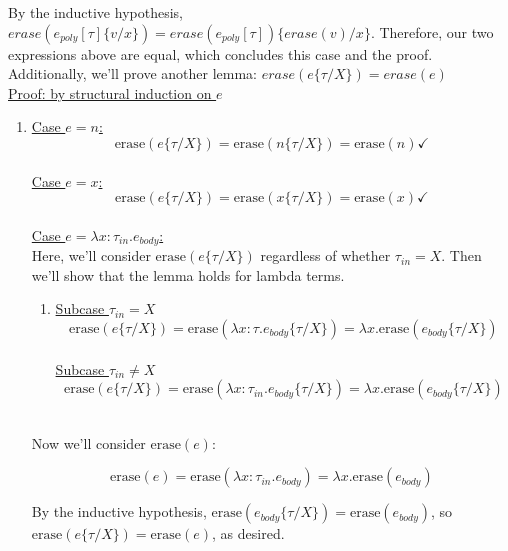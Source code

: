 \documentclass[10pt]{article}
\begin{document}
\begin{exercise}
By the inductive hypothesis, $\mathit{erase}(e_{poly}[\tau]\{v/x\}) = \mathit{erase}(e_{poly}[\tau])\{\mathit{erase}(v)/x\}$. Therefore, our two expressions above are equal, which concludes this case and the proof. \checkmark\\

Additionally, we'll prove another lemma: $erase(e\{\tau/X\}) = erase(e)$ \\

\noindent \underline{Proof: by structural induction on $e$}
\begin{enumerate}[\hspace{20pt}]
	\item
	\underline{Case $e = n$:}\\
	$$\text{erase}(e\{\tau/ X\}) = \text{erase}(n\{\tau / X\}) = \text{erase}(n) 	\checkmark$$ \\
	
	\underline{Case $e = x$:}\\
	$$\text{erase}(e\{\tau/ X\}) = \text{erase}(x\{\tau / X\}) = \text{erase}(x)
	\checkmark$$ \\
	
	\underline{Case $e = \lambda x: \tau_{in}.e_{body}$:}\\
	Here, we'll consider $\text{erase}(e\{\tau / X\})$ regardless of whether $
	\tau_{in} = X$. Then we'll show that the lemma holds for lambda terms.
	
	\begin{enumerate}[\hspace{20pt}]
	\item
	\underline{Subcase $\tau_{in} = X$} \\
	$$\text{erase}(e\{\tau / X\}) = \text{erase}(\lambda x:\tau.e_{body}\{\tau/X\}) 
	= \lambda x.\text{erase}(e_{body}\{\tau/X\})$$ \\
	
	\underline{Subcase $\tau_{in} \neq X$} \\
	$$\text{erase}(e\{\tau / X\}) = \text{erase}(\lambda x:\tau_{in}.e_{body}\{\tau/X	\}) 
	= \lambda x.\text{erase}(e_{body}\{\tau/X\})$$ \\
	\end{enumerate}
	
	Now we'll consider $\text{erase}(e)$:
	
	$$\text{erase}(e) = \text{erase}(\lambda x:\tau_{in}.e_{body}) = \lambda x.
	\text{erase}(e_{body})$$
	
	By the inductive hypothesis, $\text{erase}(e_{body} \{\tau/X\}) = \text{erase}	
	(e_{body})$, so $\text{erase}(e \{\tau/X\}) = \text{erase}(e)$, as desired.
	\checkmark \\
	

\end{enumerate}
\end{exercise}
\end{document}
